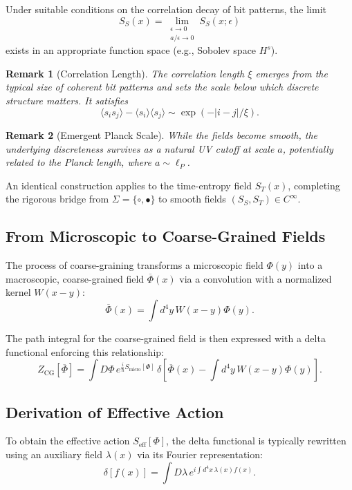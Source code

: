 \documentclass[12pt, a4paper]{article}
\newtheorem*{remark}{Remark}
\begin{document}
\begin{theorem}
Under suitable conditions on the correlation decay of bit patterns, the limit
\[
S_S(x) = \lim_{\substack{\epsilon \to 0 \\ a/\epsilon \to 0}} S_S(x; \epsilon)
\]
exists in an appropriate function space (e.g., Sobolev space $H^s$).
\end{theorem}

\begin{remark}[Correlation Length]
The correlation length $\xi$ emerges from the typical size of coherent bit patterns and sets the scale below which discrete structure matters. It satisfies
\[
\langle s_i s_j \rangle - \langle s_i \rangle \langle s_j \rangle \sim \exp(-|i - j|/\xi).
\]
\end{remark}

\begin{remark}[Emergent Planck Scale]
While the fields become smooth, the underlying discreteness survives as a natural UV cutoff at scale $a$, potentially related to the Planck length, where $a \sim \ell_P$.
\end{remark}

An identical construction applies to the time-entropy field $S_T(x)$, completing the rigorous bridge from $\Sigma = \{\circ, \bullet\}$ to smooth fields $(S_S, S_T) \in C^\infty$.
\subsection{From Microscopic to Coarse-Grained Fields}

The process of coarse-graining transforms a microscopic field $\Phi(y)$ into a macroscopic, coarse-grained field $\overline{\Phi}(x)$ via a convolution with a normalized kernel $W(x-y)$:
\[
\overline{\Phi}(x) = \int d^4 y \, W(x - y) \Phi(y).
\]

The path integral for the coarse-grained field is then expressed with a delta functional enforcing this relationship:
\[
Z_{\mathrm{CG}}[\overline{\Phi}] = \int D\Phi \, e^{\frac{i}{\hbar} S_{\mathrm{micro}}[\Phi]} \, \delta\left[ \overline{\Phi}(x) - \int d^4 y \, W(x - y) \Phi(y) \right].
\]

\subsection{Derivation of Effective Action}

To obtain the effective action $S_{\mathrm{eff}}[\Phi]$, the delta functional is typically rewritten using an auxiliary field $\lambda(x)$ via its Fourier representation:
\[
\delta[f(x)] = \int D\lambda \, e^{i \int d^4 x \, \lambda(x) f(x)}.
\]
\end{document}
